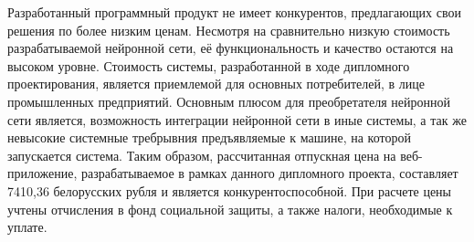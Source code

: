 {	\par \redline Разработанный программный продукт не имеет конкурентов, предлагающих свои решения по более низким ценам. Несмотря на сравнительно низкую стоимость разрабатываемой нейронной сети, её функциональность и качество остаются на высоком уровне. Стоимость системы, разработанной в ходе дипломного проектирования, является приемлемой для основных потребителей, в лице промышленных предприятий. Основным плюсом для преобретателя нейронной сети является, возможность интеграции нейронной сети в иные системы, а так же невысокие системные требрывния предъявляемые к машине, на которой запускается система. Таким образом, рассчитанная отпускная цена на веб-приложение, разрабатываемое в рамках данного дипломного проекта, составляет 7410,36 белорусских рубля и является конкурентоспособной. При расчете цены учтены отчисления в фонд социальной защиты, а также налоги, необходимые к уплате.

}

\setcounter{subchaptercntr}{1}
\setcounter{formulacntr}{1}
\setcounter{imagecntr}{1}